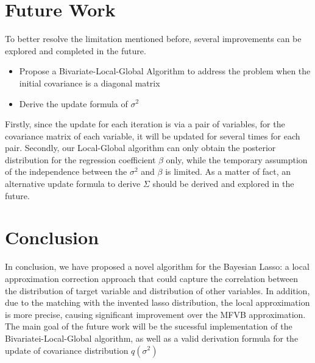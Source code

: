 \section{Future Work}
To better resolve the limitation mentioned before, several improvements can be explored and completed in the future.
\begin{itemize}
	\item Propose a Bivariate-Local-Global Algorithm to address the problem when the initial covariance is a diagonal matrix
	\item Derive the update formula of $\sigma^2$
\end{itemize}
Firstly, since the update for each iteration is via a pair of variables, for the covariance matrix of each variable, it will be updated for several times for each pair.
Secondly, our Local-Global algorithm can only obtain the posterior distribution for the regression coefficient $\beta$ only, while the temporary assumption of the independence between the $\sigma^2$ and $\beta$ is limited. As a matter of fact, an alternative update formula to derive $\Sigma$ should be derived and explored in the future.

\section{Conclusion}
In conclusion, we have proposed a novel algorithm for the Bayesian Lasso: a local approximation correction approach that could capture the correlation between the distribution of target variable and distribution of other variables. In addition, due to the matching with the invented lasso distribution, the local approximation is more precise, causing significant improvement over the MFVB approximation. The main goal of the future work will be the sucessful implementation of the Bivariatei-Local-Global algorithm, as well as a valid derivation formula for the update of covariance distribution $q(\sigma^2)$


